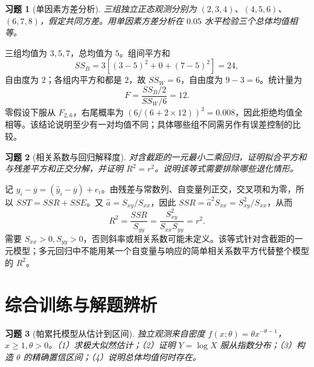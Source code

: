\documentclass[12pt,fontset=fandol]{ctexart}
\newtheorem{exercise}{习题}[section]
\begin{document}
\begin{exercise}[单因素方差分析]\label{q:B16.5}
三组独立正态观测分别为 $(2,3,4)$、$(4,5,6)$、$(6,7,8)$，假定共同方差。用单因素方差分析在 $0.05$ 水平检验三个总体均值相等。\par{}
\end{exercise}

\begin{solve}\label{a:B16.5}三组均值为 $3,5,7$，总均值为 $5$。组间平方和\[SS_B=3[(3-5)^2+0+(7-5)^2]=24,\]自由度为 $2$；各组内平方和都是 $2$，故 $SS_W=6$，自由度为 $9-3=6$。统计量为\[F=\frac{SS_B/2}{SS_W/6}=12.\]零假设下服从 $F_{2,6}$，右尾概率为 $(6/(6+2\times12))^3=0.008$，因此拒绝均值全相等。该结论说明至少有一对均值不同；具体哪些组不同需另作有误差控制的比较。\end{solve}

\begin{exercise}[相关系数与回归解释度]\label{q:B16.6}
对含截距的一元最小二乘回归，证明拟合平方和与残差平方和正交分解，并证明 $R^2=r^2$。说明该等式需要排除哪些退化情形。\par{}
\end{exercise}

\begin{solve}\label{a:B16.6}记 $y_i-\overline y=(\widehat y_i-\overline y)+e_i$。由残差与常数列、自变量列正交，交叉项和为零，所以 $SST=SSR+SSE$。又 $\widehat a=S_{xy}/S_{xx}$，因此 $SSR=\widehat a^2S_{xx}=S_{xy}^2/S_{xx}$，从而\[R^2=\frac{SSR}{S_{yy}}=\frac{S_{xy}^2}{S_{xx}S_{yy}}=r^2.\]需要 $S_{xx}>0,S_{yy}>0$，否则斜率或相关系数可能未定义。该等式针对含截距的一元模型；多元回归中不能用某一个自变量与响应的简单相关系数平方代替整个模型的 $R^2$。\end{solve}

\clearpage\section{综合训练与解题辨析}

\begin{exercise}[帕累托模型从估计到区间]\label{q:M-F-5}
独立观测来自密度 $f(x;\theta)=\theta x^{-\theta-1}$，$x\ge1,\theta>0$。（1）求极大似然估计；（2）证明 $Y=\log X$ 服从指数分布；（3）构造 $\theta$ 的精确置信区间；（4）说明总体均值何时存在。\par{}
\end{exercise}
\end{document}
